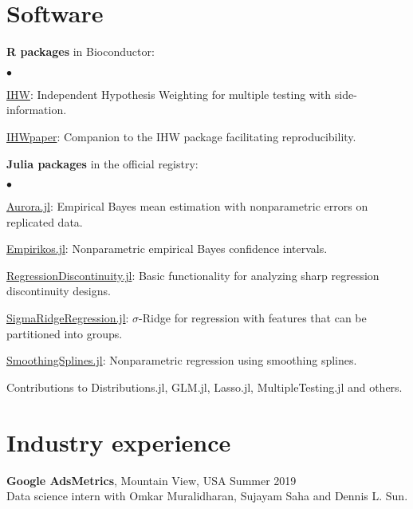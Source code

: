 \documentclass[margin,line]{res}
\newenvironment{list2}{
  \begin{list}{$\bullet$}{%
      \setlength{\itemsep}{0in}
      \setlength{\parsep}{0in} \setlength{\parskip}{0in}
      \setlength{\topsep}{0in} \setlength{\partopsep}{0in}
      \setlength{\leftmargin}{0.2in}}}{\end{list}}
\begin{document}
\begin{resume}
\section{\sc Software}
{\bf R packages} in Bioconductor:
\begin{list2}
\item \href{https://bioconductor.org/packages/IHW}{{\color{urlblue} IHW}}:  Independent Hypothesis Weighting for multiple testing with side-information.
\item \href{https://bioconductor.org/packages/IHWpaper}{{\color{urlblue} IHWpaper}}: Companion to the IHW package facilitating reproducibility.
\end{list2}
{\bf Julia packages} in the official registry:
\begin{list2}
\item \href{https://github.com/nignatiadis/Aurora.jl}{{\color{urlblue} Aurora.jl}}: Empirical Bayes mean estimation with nonparametric errors on replicated data.
\item \href{https://github.com/nignatiadis/Empirikos.jl}{{\color{urlblue} Empirikos.jl}}: Nonparametric empirical Bayes confidence intervals.
\item \href{https://github.com/nignatiadis/RegressionDiscontinuity.jl}{{\color{urlblue}  RegressionDiscontinuity.jl}}: Basic functionality for analyzing sharp regression discontinuity designs. 
\item \href{https://github.com/nignatiadis/SigmaRidgeRegression.jl}{{\color{urlblue} SigmaRidgeRegression.jl}}: $\sigma$-Ridge for regression with features that can be partitioned into groups.
\item \href{https://github.com/nignatiadis/SmoothingSplines.jl}{{\color{urlblue} SmoothingSplines.jl}}: Nonparametric regression using smoothing splines.
\item Contributions to Distributions.jl, GLM.jl, Lasso.jl, MultipleTesting.jl and others.
\end{list2}


\section{\sc Industry experience}
\textbf{Google AdsMetrics}, Mountain View, USA \hfill Summer 2019\\
Data science intern with Omkar Muralidharan, Sujayam Saha and Dennis L. Sun. 



\end{resume}
\end{document}
